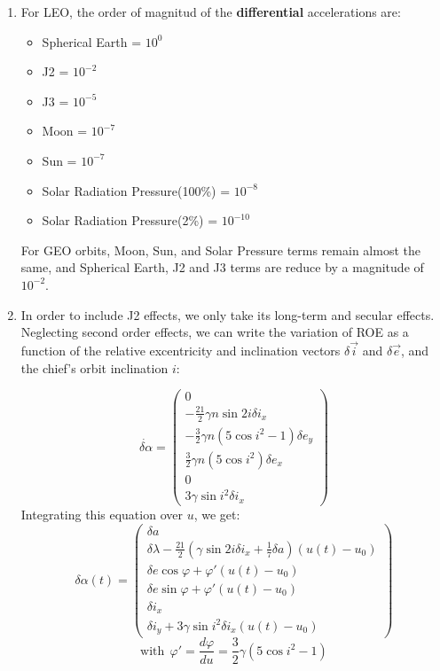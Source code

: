 \documentclass[a4paper]{report}
\begin{document}
\begin{enumerate}[label=\emph{\alph*)}]
  \item %
    For LEO, the order of magnitud of the \textbf{differential} accelerations are:
    \begin{itemize}
      \item Spherical Earth = $10^0$
      \item J2 = $10^{-2}$
      \item J3 = $10^{-5}$
      \item Moon = $10^{-7}$
      \item Sun = $10^{-7}$
      \item Solar Radiation Pressure(100\%) = $10^{-8}$
      \item Solar Radiation Pressure(2\%) = $10^{-10}$
    \end{itemize}
    For GEO orbits, Moon, Sun, and Solar Pressure terms remain almost the same, and Spherical Earth, J2 and J3 terms are reduce by a magnitude of $10^{-2}$.

  \item %
    In order to include J2 effects, we only take its long-term and secular effects. Neglecting second order effects, we can write the variation of ROE as a function of the relative excentricity and inclination vectors $\delta \vec{i}$ and $\delta \vec{e}$, and the chief's orbit inclination $i$:

    \[\dot{\delta\alpha} = \left( \begin{array}{c}
      0 \\
      -\frac{21}{2}\gamma n \sin{2i} \delta i_x \\
      -\frac{3}{2}\gamma n(5\cos{i}^2-1) \delta e_y \\
      \frac{3}{2}\gamma n (5\cos{i}^2)\delta e_x \\
      0 \\
      3\gamma\sin{i}^2 \delta i_x
      \end{array} \right) \]   
    Integrating this equation over $u$, we get:
    \[\delta \alpha(t) = \left( \begin{array}{c} \delta a \\ \delta \lambda - \frac{21}{2}(\gamma\sin{2i}\delta i_x + \frac{1}{7}\delta a)(u(t)-u_0) \\ \delta e \cos{\varphi+\varphi'(u(t)-u_0)} \\  \delta e \sin{\varphi+\varphi'(u(t)-u_0)} \\ \delta i_x \\ \delta i_y + 3\gamma \sin{i}^2 \delta i_x (u(t)-u_0) \end{array} \right) \]
    \[\mathrm{with}~~\varphi' = \frac{d\varphi}{du} = \frac{3}{2} \gamma (5 \cos{i}^2-1) \]


\end{enumerate}
\end{document}
